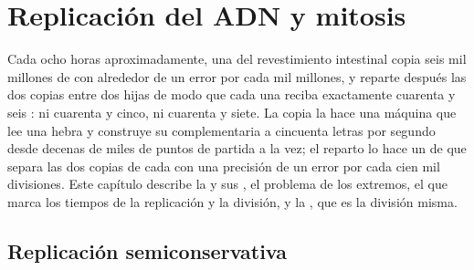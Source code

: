 \chapter{Replicación del ADN y mitosis}\label{ch:b1:replication-mitosis}

Cada ocho horas aproximadamente, una  del revestimiento intestinal
copia seis mil millones de  con alrededor de un error por cada
mil millones, y reparte después las dos copias entre dos hijas de modo que
cada una reciba exactamente cuarenta y seis : ni cuarenta y cinco,
ni cuarenta y siete. La copia la hace una máquina que lee una hebra y
construye su complementaria a cincuenta letras por segundo desde decenas de
miles de puntos de partida a la vez; el reparto lo hace un  de
 que separa las dos copias de cada  con una precisión
de un error por cada cien mil divisiones. Este capítulo describe la
 y sus , el problema de los extremos, el
 que marca los tiempos de la replicación y la división, y la
, que es la división misma.

\section{Replicación semiconservativa}

